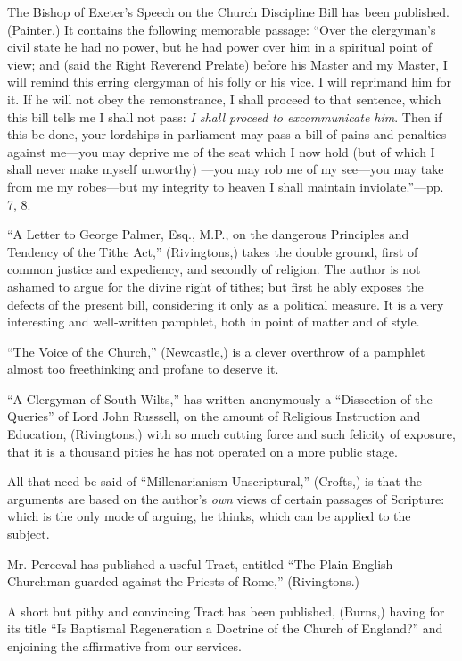 The Bishop of Exeter's Speech on the Church
Discipline Bill has been published. (Painter.) It contains the following
memorable passage: ``Over the clergyman's civil state he had no power,
but he had power over him in a spiritual point of view; and (said the
Right Reverend Prelate) before his Master and my Master, I will remind
this erring clergyman of his folly or his vice. I will reprimand him for
it. If he will not obey the remonstrance, I shall proceed to that sentence, which this bill tells me I shall not pass: \emph{I shall proceed
to excommunicate him}. Then if this be done, your lordships in
parliament may pass a bill of pains and penalties against me—you may
deprive me of the seat which I now hold (but of which I shall never make
myself unworthy) —you may rob me of my see—you may take from me my
robes—but my integrity to heaven I shall maintain inviolate.''—pp. 7,
8.

``A Letter to George Palmer, Esq., M.P., on the
dangerous Principles and Tendency of the Tithe Act,'' (Rivingtons,) takes
the double ground, first of common justice and expediency, and secondly
of religion. The author is not ashamed to argue for the divine right of
tithes; but first he ably exposes the defects of the present bill,
considering it only as a political measure. It is a very interesting and
well-written pamphlet, both in point of matter and of style.

``The Voice of the Church,'' (Newcastle,) is a clever
overthrow of a pamphlet almost too freethinking and profane to deserve
it.

``A Clergyman of South Wilts,'' has written
anonymously a ``Dissection of the Queries'' of Lord John Russsell, on the
amount of Religious Instruction and Education, (Rivingtons,) with so
much cutting force and such felicity of exposure, that it is a thousand
pities he has not operated on a more public stage.

All that need be said of ``Millenarianism
Unscriptural,'' (Crofts,) is that the arguments are based on the author's
\emph{own} views of certain passages of Scripture: which is the only
mode of arguing, he thinks, which can be applied to the subject.

Mr. Perceval has published a useful Tract, entitled
``The Plain English Churchman guarded against the Priests of Rome,'' (Rivingtons.)

A short but pithy and convincing Tract has been
published, (Burns,) having for its title ``Is Baptismal Regeneration a
Doctrine of the Church of England?'' and enjoining the affirmative from
our services.

